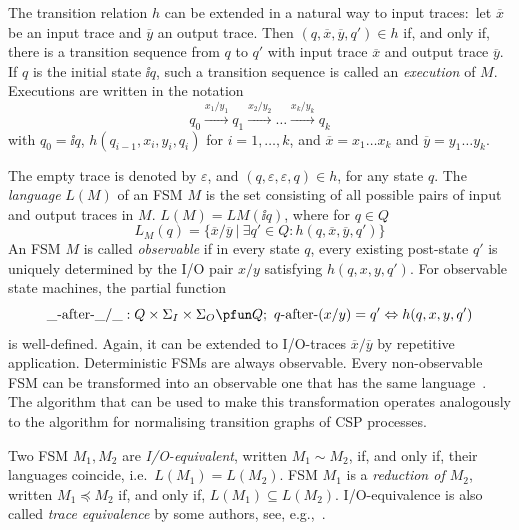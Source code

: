The transition relation $h$ can be extended in a natural way to input
traces:~let $\overline{x}$ be an input trace and $\overline{y}$ an output
trace. Then $(q,\overline{x},\overline{y},q')\in h$ if, and only if, there is
a transition sequence from $q$ to $q'$ with input trace $\overline{x}$ and
output trace $\overline{y}$. If $q$ is the initial state $\ii{q}$, such a
transition sequence is called an \emph{execution} of $M$. Executions are
written in the notation
$$
q_0 \xrightarrow{x_1/y_1} q_1 \xrightarrow{x_2/y_2} \dots \xrightarrow{x_{k}/y_{k}} q_{k}
$$
with $q_0 = \ii{q}$, $h(q_{i-1},x_i,y_i,q_{i})$ for $i = 1,\dots,k$, and
$\overline{x} = x_1\dots x_k$ and $\overline{y} = y_1\dots y_k$.

The empty trace is denoted by $\varepsilon$, and
$(q,\varepsilon,\varepsilon,q)\in h$, for any state $q$. The \emph{language}
$L(M)$ of an FSM $M$ is the set consisting of all possible pairs of input and
output traces in $M$. $L(M)= LM(\ii{q})$, where for $q\in Q$
$$
  L_M(q)=\{\overline{x}/\overline{y}~|~\exists q'\in Q: h(q,\overline{x},\overline{y},q')\}
$$
An FSM $M$ is called \emph{observable} if in every state $q$, every existing
post-state $q'$ is uniquely determined by the I/O pair $x/y$ satisfying
$h(q,x,y,q')$. For observable state machines, the partial function
$$
\_ \after\_ /\_ : Q\times\Sigma_I\times \Sigma_O \pfun Q;\
q\after(x/y) = q' \Leftrightarrow h(q,x,y,q')
$$
is well-defined. Again, it can be extended to I/O-traces $\overline
x/\overline y$ by repetitive application. Deterministic FSMs are always
observable. Every non-observable FSM can be transformed into an observable
one that has the same language~\cite{PeleskaHuangLectureNotesMBT}. The
algorithm that can be used to make this transformation operates analogously
to the algorithm for normalising transition graphs of CSP processes.


Two FSM $M_1, M_2$ are \emph{I/O-equivalent}, written $M_1\sim M_2$, if, and
only if, their languages coincide, i.e.~$L(M_1) = L(M_2)$. FSM $M_1$ is a
\emph{reduction of $M_2$}, written $M_1 \preceq M_2$ if, and only if, $L(M_1)
\subseteq L(M_2)$. I/O-equivalence is also called \emph{trace equivalence} by
some authors, see, e.g.,~\cite{luo_test_1994}.


